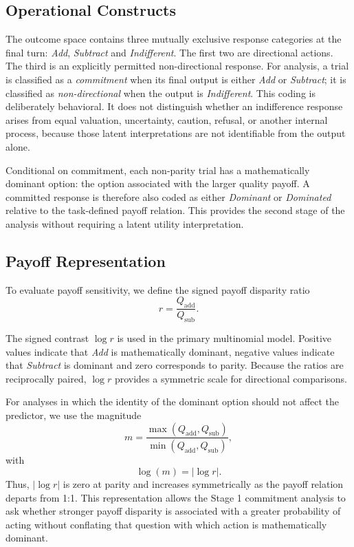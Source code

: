 \documentclass[10pt,journal,compsoc]{IEEEtran}
\begin{document}
\subsection{Operational Constructs}
The outcome space contains three mutually exclusive response categories at the final turn:
\textit{Add}, \textit{Subtract} and \textit{Indifferent}. The first two are directional actions. The third is an explicitly permitted non-directional response. For analysis, a trial is classified as a \textit{commitment} when its final output is either \textit{Add} or \textit{Subtract}; it is classified as \textit{non-directional} when the output is \textit{Indifferent}. This coding is deliberately behavioral. It does not distinguish whether an indifference response arises from equal valuation, uncertainty, caution, refusal, or another internal process, because those latent interpretations are not identifiable from the output alone.

Conditional on commitment, each non-parity trial has a mathematically dominant option: the option associated with the larger quality payoff. A committed response is therefore also coded as either \textit{Dominant} or \textit{Dominated} relative to the task-defined payoff relation. This provides the second stage of the analysis without requiring a latent utility interpretation.

\subsection{Payoff Representation}
To evaluate payoff sensitivity, we define the signed payoff disparity ratio
\begin{equation}
    r = \frac{Q_{\mathrm{add}}}{Q_{\mathrm{sub}}}.
\end{equation}

The signed contrast $\log r$ is used in the primary multinomial model. Positive values indicate that \textit{Add} is mathematically dominant, negative values indicate that \textit{Subtract} is dominant and zero corresponds to parity. Because the ratios are reciprocally paired, $\log r$ provides a symmetric scale for directional comparisons.

For analyses in which the identity of the dominant option should not affect the predictor, we use the magnitude
\begin{equation}
    m = \frac{\max(Q_{\mathrm{add}},Q_{\mathrm{sub}})}{\min(Q_{\mathrm{add}},Q_{\mathrm{sub}})},
\end{equation}
with
\begin{equation}
    \log(m)=|\log r|.
\end{equation}
Thus, $|\log r|$ is zero at parity and increases symmetrically as the payoff relation departs from 1:1. This representation allows the Stage 1 commitment analysis to ask whether stronger payoff disparity is associated with a greater probability of acting without conflating that question with which action is mathematically dominant. 
\end{document}
